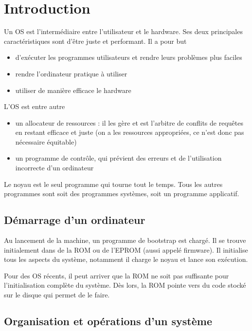 \chapter{Introduction}

Un OS est l'intermédiaire entre l'utilisateur et le hardware. Ses deux principales caractéristiques sont d'être juste et performant. Il a pour but

\begin{itemize}
	\item d'exécuter les programmes utilisateurs et rendre leurs problèmes plus faciles
	\item rendre l'ordinateur pratique à utiliser
	\item utiliser de manière efficace le hardware
\end{itemize}

L'OS est entre autre

\begin{itemize}
	\item un allocateur de ressources : il les gère et est l'arbitre de conflits de requêtes en restant efficace et juste (on a les ressources appropriées, ce n'est donc pas nécessaire équitable)
	\item un programme de contrôle, qui prévient des erreurs et de l'utilisation incorrecte d'un ordinateur
\end{itemize}

Le noyau est le seul programme qui tourne tout le temps. Tous les autres programmes sont soit des programmes systèmes, soit un programme applicatif.

	\section{Démarrage d'un ordinateur}
	
	Au lancement de la machine, un programme de bootstrap est chargé. Il se trouve initialement dans de la ROM ou de l'EPROM (aussi appelé firmware). Il initialise tous les aspects du système, notamment il charge le noyau et lance son exécution.
	
	Pour des OS récents, il peut arriver que la ROM ne soit pas suffisante pour l'initialisation complète du système. Dès lors, la ROM pointe vers du code stocké sur le disque qui permet de le faire.
	
	\section{Organisation et opérations d'un système}
	

